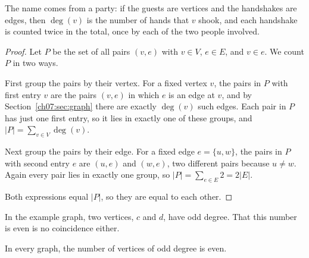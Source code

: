 The name comes from a party: if the guests are vertices and the handshakes are edges, then $\deg(v)$ is the number of hands that $v$ shook, and each handshake is counted twice in the total, once by each of the two people involved.

\begin{proof}
Let $P$ be the set of all pairs $(v,e)$ with $v\in V$, $e\in E$, and $v\in e$. We count $P$ in two ways.

First group the pairs by their vertex. For a fixed vertex $v$, the pairs in $P$ with first entry $v$ are the pairs $(v,e)$ in which $e$ is an edge at $v$, and by Section~\ref{ch07:sec:graph} there are exactly $\deg(v)$ such edges. Each pair in $P$ has just one first entry, so it lies in exactly one of these groups, and $|P|=\sum_{v\in V}\deg(v)$.

Next group the pairs by their edge. For a fixed edge $e=\{u,w\}$, the pairs in $P$ with second entry $e$ are $(u,e)$ and $(w,e)$, two different pairs because $u\ne w$. Again every pair lies in exactly one group, so $|P|=\sum_{e\in E}2=2|E|$.

Both expressions equal $|P|$, so they are equal to each other.
\end{proof}

In the example graph, two vertices, $c$ and $d$, have odd degree. That this number is even is no coincidence either.

\par\noindent\begin{minipage}{\linewidth}
\begin{proposition}\label{ch07:prop:odd}
In every graph, the number of vertices of odd degree is even.
\end{proposition}
\end{minipage}\par

